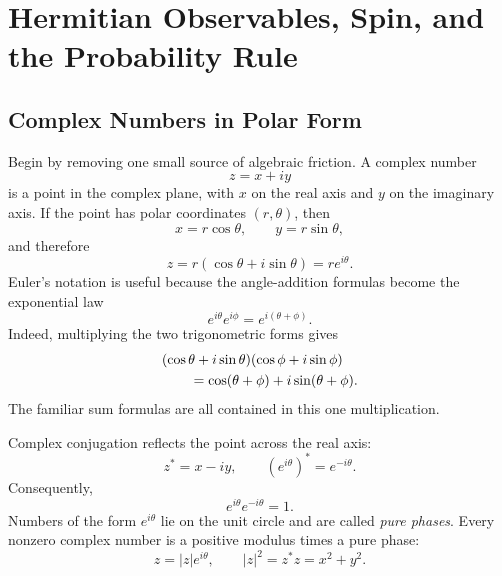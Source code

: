 \chapter{Hermitian Observables, Spin, and the Probability Rule}


\section{Complex Numbers in Polar Form}

Begin by removing one small source of algebraic friction. A complex number
\begin{equation}
  z=x+iy
\end{equation}
is a point in the complex plane, with \(x\) on the real axis and \(y\) on the imaginary axis. If the point has polar coordinates \((r,\theta)\), then
\begin{equation}
  x=r\cos\theta,
  \qquad
  y=r\sin\theta,
\end{equation}
and therefore
\begin{equation}
  z=r(\cos\theta+i\sin\theta)=re^{i\theta}.
  \label{eq:l03-polar-form}
\end{equation}
Euler's notation is useful because the angle-addition formulas become the exponential law
\begin{equation}
  e^{i\theta}e^{i\phi}
  =e^{i(\theta+\phi)}.
  \label{eq:l03-phase-product}
\end{equation}
Indeed, multiplying the two trigonometric forms gives
\begin{align}
& (\cos\theta+i\sin\theta)(\cos\phi+i\sin\phi)
\notag\\
&\qquad=\cos(\theta+\phi)+i\sin(\theta+\phi).
\end{align}
The familiar sum formulas are all contained in this one multiplication.

Complex conjugation reflects the point across the real axis:
\begin{equation}
  z^*=x-iy,
  \qquad
  (e^{i\theta})^*=e^{-i\theta}.
\end{equation}
Consequently,
\begin{equation}
  e^{i\theta}e^{-i\theta}=1.
\end{equation}
Numbers of the form \(e^{i\theta}\) lie on the unit circle and are called \emph{pure phases}. Every nonzero complex number is a positive modulus times a pure phase:
\begin{equation}
  z=|z|e^{i\theta},
  \qquad
  |z|^2=z^*z=x^2+y^2.
  \label{eq:l03-modulus-phase}
\end{equation}

